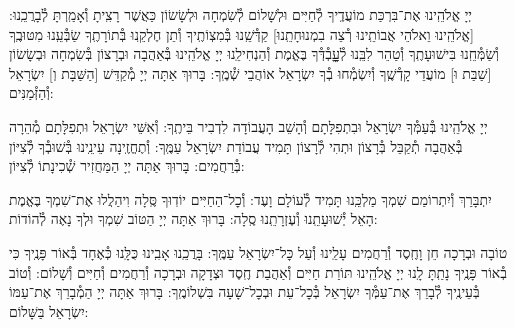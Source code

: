 \documentclass[twoside, openany, parskip=half, 11pt]{book}
\begin{document}
יְיָ אֱלֹהֵֽינוּ אֶת־בִּרְכַּת מוֹעֲדֶֽיךָ לְ֯חַיִּים וּלְשָׁלוֹם לְ֯שִׂמְחָה וּלְשָׂשׂוֹן כַּאֲשֶׁר רָצִֽיתָ וְ֯אָמַֽרְתָּ לְ֯בָרֲכֵֽנוּ: [\shabbos אֱלֹהֵֽינוּ וֵאלֹהֵי אֲבוֹתֵֽינוּ רְ֯צֵה בִמְנוּחָתֵֽנוּ] קַדְּ֯שֵֽׁנוּ בְּ֯מִצְוֹתֶֽיךָ וְ֯תֵן חֶלְקֵֽנוּ בְּ֯תוֹרָתֶֽךָ שַׂבְּ֯עֵֽנוּ מִטּוּבֶֽךָ וְ֯שַׂמְּ֯חֵֽנוּ בִּישׁוּעָתֶֽךָ וְ֯טַהֵר לִבֵּֽנוּ לְ֯עׇׇׇׇבְ֯דְּ֯ךָ בֶּאֱמֶת וְ֯הַנְחִילֵֽנוּ יְיָ אֱלֹהֵֽינוּ בְּ֯אַהֲבָה וּבְרָצוֹן בְּ֯שִׂמְחָה וּבְשָׂשׂוֹן [\shabbos שַׁבַּת וּ] מוֹעֲדֵי קָדְ֯שֶֽׁךָ וְ֯יִשְׂמְ֯חוּ בְ֯ךָ יִשְׂרָאֵל אוֹהֲבֵי שְׁ֯מֶֽךָ: בָּרוּךְ אַתָּה יְיָ מְ֯קַדֵּשׁ
[\shabbos הַשַּׁבָּת וְ] יִשְׂרָאֵל וְ֯הַזְּ֯מַנִּים:


יְיָ אֱלֹהֵֽינוּ בְּ֯עַמְּ֯ךָ יִשְׂרָאֵל וּבִתְפִלָּתָם וְ֯הָשֵׁב הָעֲבוֹדָה לִדְבִיר בֵּיתֶֽךָ: וְ֯אִשֵּׁי יִשְׂרָאֵל וּתְפִלָּתָם מְ֯הֵרָה בְּ֯אַהֲבָה תְ֯קַבֵּל בְּ֯רָצוֹן וּתְהִי לְ֯רָצוֹן תָּמִיד עֲבוֹדַת יִשְׂרָאֵל עַמֶּֽךָ: וְ֯תֶחֱזֶֽינָה עֵינֵֽינוּ בְּ֯שׁוּבְ֯ךָ לְ֯צִיּוֹן בְּ֯רַחֲמִים: בָּרוּךְ אַתָּה יְיָ הַמַּחֲזִיר שְׁ֯כִינָתוֹ לְ֯צִיּוֹן:

\modim


\vspace{-\baselineskip}
יִתְבָּרַךְ וְ֯יִתְרוֹמַם שִׁמְךָ מַלְכֵּֽנוּ תָּמִיד לְ֯עוֹלָם וָעֶד: וְ֯כׇל־הַחַיִּים יוֹדֽוּךָ סֶּֽלָה וִיהַלֲלוּ אֶת־שִׁמְךָ בֶּאֱמֶת הָאֵל יְ֯שׁוּעָתֵֽנוּ וְ֯עֶזְרָתֵֽנוּ סֶֽלָה: בָּרוּךְ אַתָּה יְיָ הַטּוֹב שִׁמְךָ וּלְךָ נָאֶה לְ֯הוֹדוֹת:



טוֹבָה וּבְרָכָה חֵן וָחֶֽסֶד וְ֯רַחֲמִים עָלֵֽינוּ וְ֯עַל כׇּל־יִשְׂרָאֵל עַמֶּֽךָ: בָּרֲכֵֽנוּ אָבִֽינוּ כֻּלָּֽנוּ כְּ֯אֶחָד בְּ֯אוֹר פָּנֶֽיךָ כִּי בְ֯אוֹר פָּנֶֽיךָ נָתַֽתָּ לָֽנוּ יְיָ אֱלֹהֵֽינוּ תּוֹרַת חַיִּים וְ֯אַהֲבַת חֶֽסֶד וּצְדָקָה וּבְרָכָה וְ֯רַחֲמִים וְ֯חַיִּים וְ֯שָׁלוֹם: וְ֯טוֹב בְּ֯עֵינֶֽיךָ לְ֯בָרֵךְ אֶת־עַמְּ֯ךָ יִשְׂרָאֵל בְּ֯כׇל־עֵת וּבְכׇל־שָׁעָה בִּשְׁלוֹמֶֽךָ: בָּרוּךְ אַתָּה יְיָ הַמְ֯בָרֵךְ אֶת־עַמּוֹ יִשְׂרָאֵל בַּשָּׁלוֹם:

\tachanunim

\vfill


\\

\sepline

\\
\\
\end{document}
